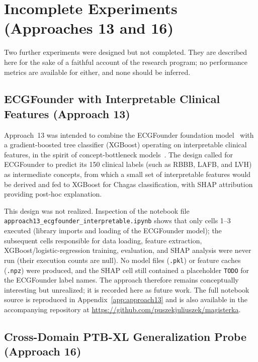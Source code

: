 \section{Incomplete Experiments (Approaches 13 and 16)}
\label{sec:incomplete}

Two further experiments were designed but not completed. They are described here for the sake of a faithful account of the research program; no performance metrics are available for either, and none should be inferred.

\subsection{ECGFounder with Interpretable Clinical Features (Approach 13)}

Approach~13 was intended to combine the ECGFounder foundation model~\cite{li2024ecgfounder} with a gradient-boosted tree classifier (XGBoost) operating on interpretable clinical features, in the spirit of concept-bottleneck models~\cite{koh2020concept}. The design called for ECGFounder to predict its 150 clinical labels (such as RBBB, LAFB, and LVH) as intermediate concepts, from which a small set of interpretable features would be derived and fed to XGBoost for Chagas classification, with SHAP attribution providing post-hoc explanation.

This design was not realized. Inspection of the notebook file\\ \texttt{approach13\_ecgfounder\_interpretable.ipynb} shows that only cells 1--3 executed (library imports and loading of the ECGFounder model); the subsequent cells responsible for data loading, feature extraction, XGBoost/logistic-regression training, evaluation, and SHAP analysis were never run (their execution counts are null). No model files (\texttt{.pkl}) or feature caches (\texttt{.npz}) were produced, and the SHAP cell still contained a placeholder \texttt{TODO} for the ECGFounder label names. The approach therefore remains conceptually interesting but unrealized; it is recorded here as future work. The full notebook source is reproduced in Appendix~\ref{app:approach13} and is also available in the accompanying repository at \url{https://github.com/puszekjuliuszek/magisterka}.

\subsection{Cross-Domain PTB-XL Generalization Probe (Approach 16)}

